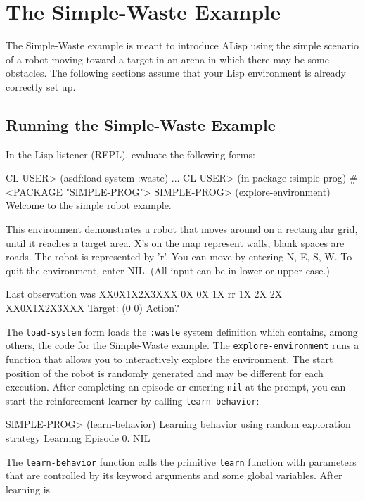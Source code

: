 \documentclass[a4paper]{amsart}
\begin{document}
\section{The Simple-Waste Example}
\label{sec:simple-waste}

The Simple-Waste example is meant to introduce ALisp using the simple
scenario of a robot moving toward a target in an arena in which there
may be some obstacles.  The following sections assume that your Lisp
environment is already correctly set up.

\subsection{Running the Simple-Waste Example}
\label{sec:running-simple-waste}

In the Lisp listener (REPL), evaluate the following forms:
\begin{Code}
  CL-USER> (asdf:load-system :waste)
  \lsq...\rsq
  CL-USER> (in-package :simple-prog)
  #<PACKAGE "SIMPLE-PROG">
  SIMPLE-PROG> (explore-environment)
  Welcome to the simple robot example.

  This environment demonstrates a robot that moves around on a
  rectangular grid, until it reaches a target area.  X's on the map
  represent walls, blank spaces are roads.  The robot is represented
  by 'r'.  You can move by entering N, E, S, W.  To quit the
  environment, enter NIL.  (All input can be in lower or upper case.)

  Last observation was 
  XX0X1X2X3XXX
  0X        0X
  1X  rr    1X
  2X        2X
  XX0X1X2X3XXX
  Target: (0 0)
  Action?
\end{Code}
The \texttt{load-system} form loads the \texttt{:waste} system
definition which contains, among others, the code for the Simple-Waste
example.  The \texttt{explore-environment} runs a function that allows
you to interactively explore the environment.  The start position of
the robot is randomly generated and may be different for each
execution.  After completing an episode or entering \texttt{nil} at
the prompt, you can start the reinforcement learner by calling
\texttt{learn-behavior}:
\begin{Code}
  SIMPLE-PROG> (learn-behavior)
  Learning behavior using random exploration strategy
  Learning
  Episode 0.
  NIL
\end{Code}
The \texttt{learn-behavior} function calls the primitive
\texttt{learn} function with parameters that are controlled by its
keyword arguments and some global variables.  After learning is
\end{document}
